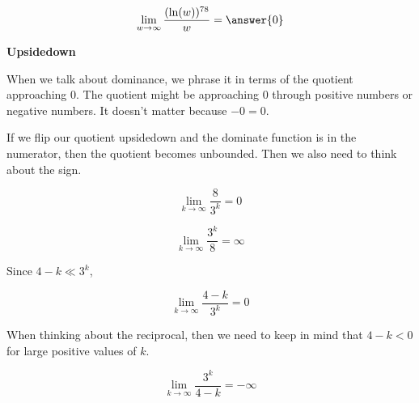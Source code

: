 \documentclass{ximera}
\begin{document}
\begin{question}

\[
\lim\limits_{w \to \infty} \frac{(\ln(w))^{78}}{w} = \answer{0}
\]

\end{question}






\begin{idea} \textbf{\textcolor{blue!55!black}{Upsidedown}}


When we talk about dominance, we phrase it in terms of the quotient approaching $0$.  The quotient might be approaching $0$ through positive numbers or negative numbers.  It doesn't matter because $-0 = 0$.


If we flip our quotient upsidedown and the dominate function is in the numerator, then the quotient becomes unbounded. Then we also need to think about the sign.


\end{idea}



\begin{example}




\[
\lim\limits_{k \to \infty} \frac{8}{3^k} = 0
\]



\[
\lim\limits_{k \to \infty} \frac{3^k}{8} = \infty 
\]




\end{example}









\begin{example}



Since $4 - k \ll 3^k$,

\[
\lim\limits_{k \to \infty} \frac{4 - k}{3^k} = 0
\]


When thinking about the reciprocal, then we need to keep in mind that $4 - k < 0$ for large positive values of $k$.



\[
\lim\limits_{k \to \infty} \frac{3^k}{4 - k} = -\infty 
\]




\end{example}
\end{document}
